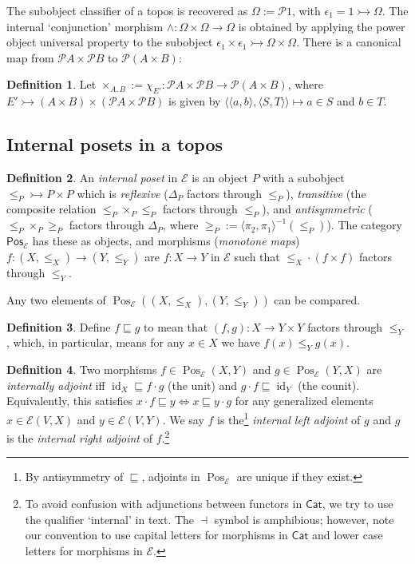 \documentclass{article}
\theoremstyle{definition}
\newtheorem{definition}{Definition}[section]
\newcommand{\cE}{\mathcal{E}}
\newcommand{\cP}{\mathcal{P}}
\newcommand{\cat}[1]{\mathsf{#1}}
\newcommand{\id}{\operatorname{id}}
\newcommand{\Pos}{\operatorname{Pos}}
\begin{document}
The subobject classifier of a topos is recovered as $\Omega:=\cP 1$, with $\epsilon_1 = 1 \rightarrowtail \Omega$. The internal `conjunction' morphism $\wedge\colon \Omega\times \Omega\to\Omega$ is obtained by applying the power object universal property to the subobject $\epsilon_1\times \epsilon_1 \rightarrowtail \Omega\times \Omega$. There is a canonical map from $\cP A \times \cP B$ to $\cP(A\times B)$:

\begin{definition}
    \label{def:strength}
    Let $\times_{A,B}:=\chi_{E'}\colon\cP A\times\cP B\to\cP(A\times B)$, where $E'\rightarrowtail (A\times B)\times(\cP A\times\cP B)$ is given by $\langle\langle a,b\rangle,\langle S,T\rangle\rangle\mapsto a\in S$ and $b\in T$. 
\end{definition}

\subsection{Internal posets in a topos}

\begin{definition}
\label{def:intposet}
An {\it internal poset} in $\cE$ is an object $P$ with a subobject $\leq_P\rightarrowtail P\times P$ which is {\it reflexive}  ($\Delta_P$ factors through $\leq_P$), {\it transitive} (the composite relation $\leq_P \times_P \leq_P$ factors through $\leq_P$), and {\it antisymmetric} ($\leq_P\times_P \geq_P$ factors through $\Delta_P$, where
    $\geq_P:=\langle\pi_2,\pi_1\rangle^{-1}(\leq_P)$).
The category $\cat{Pos}_\cE$ has these as objects, and morphisms ({\it monotone maps}) $f\colon(X,\leq_X)\to(Y,\leq_{Y})$
are $f\colon X\to Y$ in $\cE$ such that $\leq_X \cdot (f\times f)$ factors through $\leq_{Y}$. 
\end{definition}

Any two elements of $\Pos_\cE((X,\leq_X),(Y,\leq_Y))$ can be compared. 

\begin{definition}
    Define $f \sqsubseteq g$ to mean that $(f,g)\colon X\to Y\times Y$ factors through $\leq_Y$, which, in particular, means for any $x \in X$ we have $f(x)\leq_Y g(x)$.
\end{definition}

\begin{definition}
    \label{def:supadj}
    Two morphisms $f \in \Pos_\cE(X,Y)$ and $g\in \Pos_\cE(Y,X)$ are {\it internally adjoint} iff $\id_X \sqsubseteq  f \cdot g$ (the unit) and $ g \cdot f \sqsubseteq \id_Y$ (the counit). Equivalently, this satisfies $x \cdot f \sqsubseteq y  \iff x\sqsubseteq y\cdot g$ for any generalized elements $x \in \cE(V,X)$ and $y \in \cE(V, Y)$. We say $f$ is the\footnote{By antisymmetry of $\sqsubseteq$, adjoints in $\Pos_\cE$ are unique if they exist.} {\it internal left adjoint} of $g$ and $g$ is the {\it internal right adjoint} of $f$.\footnote{To avoid confusion with adjunctions between functors in $\cat{Cat}$, we try to use the qualifier `internal' in text. The $\dashv$ symbol is amphibious; however, note our convention to use capital letters for morphisms in $\cat{Cat}$ and lower case letters for morphisms in $\cE$.}
\end{definition}
\end{document}
